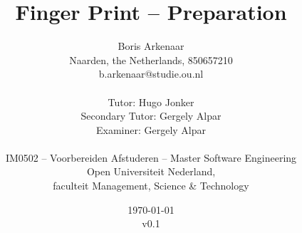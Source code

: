 \title{Finger Print -- Preparation}
\author{
  Boris Arkenaar\\
  Naarden, the Netherlands, 850657210\\
  b.arkenaar@studie.ou.nl\\
  \\
  Tutor: Hugo Jonker\\
  Secondary Tutor: Gergely Alpar\\
  Examiner: Gergely Alpar\\
  \\
  IM0502 -- Voorbereiden Afstuderen -- Master Software Engineering\\
  Open Universiteit Nederland,\\
  faculteit Management, Science \& Technology}
\date{\today\\v0.1}
\maketitle

